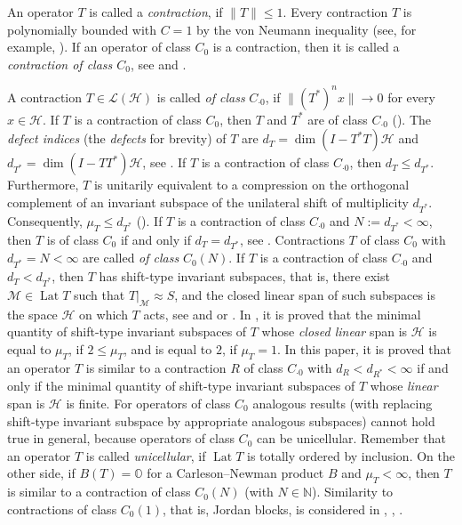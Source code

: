 \documentclass[a4paper,oneside,11pt]{amsart}
\numberwithin{equation}{section}
\theoremstyle{plain}
\theoremstyle{definition}
\begin{document}
 An  operator $T$  is called a  \emph{contraction}, if $\|T\|\leq 1$. 
Every contraction $T$  is polynomially bounded with $C=1$ 
 by the von Neumann inequality (see, for example, {\cite[Proposition I.8.3]{sznfbk}}). 
If an operator of class $C_0$ is a contraction, then it is called a \emph{contraction of class $C_0$}, 
see \cite{berc} and \cite{sznfbk}.

A contraction  $T\in\mathcal L(\mathcal H)$  is called  \emph{of class} $C_{\cdot 0}$, if 
$\|(T^*)^nx\|\to 0$ for every $x\in\mathcal H$. If $T$ is a contraction of class $C_0$, 
then $T$ and $T^*$ are of class  $C_{\cdot 0}$ ({\cite[Proposition III.4.2]{sznfbk}}). 
The \emph{defect indices} (the \emph{defects} for brevity) of $T$ are $d_T=\dim(I-T^*T)\mathcal H$ and $d_{T^*}=\dim(I-TT^*)\mathcal H$, 
see  {\cite[Sec. I.3.1]{sznfbk}}.  If $T$ is a contraction of class $C_{\cdot 0}$, then 
$d_T\leq d_{T^*}$. Furthermore,  $T$ is unitarily equivalent to a compression 
on the orthogonal complement of an invariant subspace of 
the unilateral shift of multiplicity $d_{T^*}$. Consequently, $\mu_T\leq d_{T^*}$
({\cite[Corollary X.3.3]{sznfbk}}).  If $T$ is a contraction of class $C_{\cdot 0}$ and $N:=d_{T^*}<\infty$, 
then $T$ is of class $C_0$ if and only if $d_T=d_{T^*}$, see \cite{sznf74}. Contractions  $T$ of class $C_0$ with 
$d_{T^*}=N<\infty$ are called \emph{of class} $C_0(N)$. 
If $T$ is a contraction of class $C_{\cdot 0}$ and $d_T<d_{T^*}$, then $T$ has shift-type invariant subspaces, 
that is, there exist $\mathcal M\in\operatorname{Lat}T$ such that $T|_{\mathcal M}\approx S$, 
and the closed linear span of  such subspaces  is  the space $\mathcal H$  on which $T$ acts, see \cite{sznf74} and \cite{kerchy} 
or   {\cite[Sec. IX.3]{sznfbk}}.  
In \cite{gamal22}, it is proved that the minimal quantity of shift-type invariant subspaces of $T$ 
whose \emph{closed linear} span is  $\mathcal H$ is equal to 
$\mu_T$, if $2\leq\mu_T$, and is equal to $2$, if $\mu_T=1$. In this paper, it is proved that an operator $T$ 
is similar to a contraction $R$ of class  $C_{\cdot 0}$ with $d_R<d_{R^*}<\infty$  if and only if 
 the minimal quantity of shift-type invariant subspaces of $T$ 
whose \emph{linear} span is  $\mathcal H$ is finite. For  operators of class $C_0$ 
analogous results (with replacing shift-type invariant subspace by appropriate analogous subspaces) cannot hold true in general,  because operators of class $C_0$  can be unicellular.
 Remember that an operator $T$ is called \emph{unicellular}, if $\operatorname{Lat}T$ is totally ordered by inclusion. 
On the other side, if $B(T)=\mathbb O$ for a Carleson--Newman product $B$ and $\mu_T<\infty$, then 
$T$ is similar to a contraction of class $C_0(N)$ (with $N\in\mathbb N$). Similarity to  contractions of class $C_0(1)$, that is, Jordan blocks, is considered in \cite{clouatre11},  \cite{clouatre14},  \cite{clouatre15}. 
\end{document}
